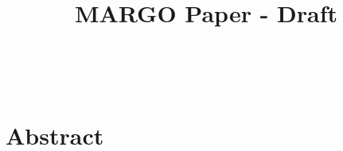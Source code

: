 \documentclass[10pt]{article}
\begin{document}
	
\renewcommand*\rmdefault{phv}
\selectfont
	
\title{MARGO Paper - Draft}
\maketitle

\newcommand{\avg}[1]{\left<{#1}\right>}
\newcommand{\hence}{\hspace{1cm}\Longrightarrow\hspace{1cm}}
\renewcommand{\ni}{\noindent}
\newcommand{\din}{\indent \indent}
\newcommand{\mni}{\medskip \noindent}
\newcommand{\bni}{\bigskip \noindent}
\newcommand{\sni}{\smallskip \noindent}
\newcommand{\pr}{{\rm Prob}}
\newcommand{\mon}{\begin{displaymath}}
\newcommand{\moff}{\end{displaymath}}
\newcommand{\sumi}[1]{\sum_{{#1}=-\infty}^{\infty}}
\renewcommand{\b}[1]{\mbox{\boldmath ${#1}$}}
\newcommand{\sumy}{\sum_{\b{y}}}
\newcommand{\sumz}{\sum_{\b{z}}}
\newcommand{\pd}[2]{\frac{\partial {#1}}{\partial {#2}}}
\newcommand{\od}[2]{\frac{d {#1}}{d {#2}}}
\newcommand{\odat}[3]{\left. \frac{d {#1}}{d {#2}} \right|_{#3}}
\newcommand{\inti}{\int_{-\infty}^{\infty}}
\newcommand{\eon}{\begin{equation}}
\newcommand{\eoff}{\end{equation}}
\newcommand{\eaon}{\begin{eqnarray}}
\newcommand{\eaoff}{\end{eqnarray}}
\newcommand{\e}[1]{\times 10^{#1}}
\newcommand{\chem}[2]{{}^{#2} \mathrm{#1}}
\renewcommand{\sb}{s}
\newcommand{\s}{s}
\newcommand{\zetaexp}{\left( \zeta e^{q \s t} \right)}
\newcommand{\taunuc}{\tau_{nuc}}
\newcommand{\eq}[1]{Eq. (\ref{#1})}\
\newcommand{\ev}[1]{\langle #1 \rangle}
\newcommand*\mean[1]{${\bar{#1}}$}

\cleardoublepage

\newpage


\section{Abstract}
\end{document}
